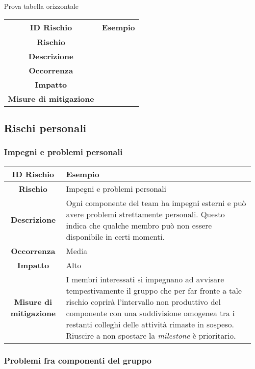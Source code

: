 \documentclass[10pt, a4paper]{article}
\begin{document}

Prova tabella orizzontale


{\renewcommand{\arraystretch}{1.5}
\begin{tabularx}{\textwidth}{c|X}
\textbf{ID Rischio} & Esempio \\
\hline
\textbf{Rischio} &  \\
\hline
\textbf{Descrizione} & \\
\hline
\textbf{Occorrenza} & \\
\hline
\textbf{Impatto} & \\
\hline
\textbf{Misure di mitigazione} & \\
\end{tabularx}


\subsection{Rischi personali}


\subsubsection{Impegni e problemi personali}
{\renewcommand{\arraystretch}{1.5}
\begin{tabularx}{\textwidth}{c|X}
\textbf{ID Rischio} & Esempio \\
\hline
\textbf{Rischio} & Impegni e problemi personali\\
\hline
\textbf{Descrizione} & Ogni componente del team ha impegni esterni e può avere problemi strettamente personali. Questo indica che qualche membro può non essere disponibile in certi momenti.\\
\hline
\textbf{Occorrenza} & Media\\
\hline
\textbf{Impatto} & Alto\\
\hline
\textbf{Misure di mitigazione} & I membri interessati si impegnano ad avvisare tempestivamente il gruppo che per far fronte a tale rischio coprirà l’intervallo non produttivo del componente con una suddivisione omogenea tra i restanti colleghi delle attività rimaste in sospeso.
Riuscire a non spostare la \textit{milestone} è prioritario.\\
\end{tabularx}}




\subsubsection{Problemi fra componenti del gruppo}

}
\end{document}
